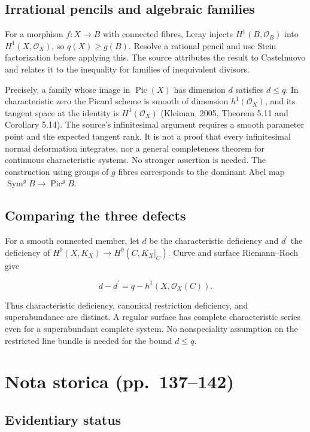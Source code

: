 \subsection{Irrational pencils and algebraic families}

For a morphism \(f:X\to B\) with connected fibres, Leray injects \(H^1(B,\mathcal O_B)\) into \(H^1(X,\mathcal O_X)\), so \(q(X)\ge g(B)\). Resolve a rational pencil and use Stein factorization before applying this. The source attributes the result to Castelnuovo and relates it to the inequality for families of inequivalent divisors.

Precisely, a family whose image in \(\operatorname{Pic}(X)\) has dimension \(d\) satisfies \(d\le q\). In characteristic zero the Picard scheme is smooth of dimension \(h^1(\mathcal O_X)\), and its tangent space at the identity is \(H^1(\mathcal O_X)\) (Kleiman, 2005, Theorem 5.11 and Corollary 5.14). The source's infinitesimal argument requires a smooth parameter point and the expected tangent rank. It is not a proof that every infinitesimal normal deformation integrates, nor a general completeness theorem for continuous characteristic systems. No stronger assertion is needed. The construction using groups of \(g\) fibres corresponds to the dominant Abel map \(\operatorname{Sym}^gB\to\operatorname{Pic}^gB\).

\subsection{Comparing the three defects}

For a smooth connected member, let \(d\) be the characteristic deficiency and \(d^\prime\) the deficiency of \(H^0(X,K_X)\to H^0(C,K_X|_C)\). Curve and surface Riemann--Roch give

\[d-d^\prime=q-h^1(X,\mathcal O_X(C)).\]

Thus characteristic deficiency, canonical restriction deficiency, and superabundance are distinct. A regular surface has complete characteristic series even for a superabundant complete system. No nonspeciality assumption on the restricted line bundle is needed for the bound \(d\le q\).

\section[Nota storica]{Nota storica (pp.~137--142)}\label{enriques-iv-13}

\subsection{Evidentiary status}

